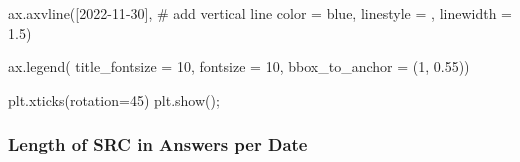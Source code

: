 \documentclass[
  letterpaper,
  DIV=11,
  numbers=noendperiod]{scrartcl}
\newenvironment{Shaded}{\begin{snugshade}}{\end{snugshade}}
\newcommand{\CommentTok}[1]{\textcolor[rgb]{0.37,0.37,0.37}{#1}}
\newcommand{\DecValTok}[1]{\textcolor[rgb]{0.68,0.00,0.00}{#1}}
\newcommand{\FloatTok}[1]{\textcolor[rgb]{0.68,0.00,0.00}{#1}}
\newcommand{\NormalTok}[1]{\textcolor[rgb]{0.00,0.23,0.31}{#1}}
\newcommand{\OperatorTok}[1]{\textcolor[rgb]{0.37,0.37,0.37}{#1}}
\newcommand{\StringTok}[1]{\textcolor[rgb]{0.13,0.47,0.30}{#1}}
\begin{document}
\begin{Shaded}
\begin{Highlighting}[]
\NormalTok{ax.axvline([}\StringTok{\textquotesingle{}2022{-}11{-}30\textquotesingle{}}\NormalTok{], }\CommentTok{\# add vertical line}
\NormalTok{           color }\OperatorTok{=} \StringTok{\textquotesingle{}blue\textquotesingle{}}\NormalTok{,}
\NormalTok{           linestyle }\OperatorTok{=} \StringTok{\textquotesingle{}{-}{-}\textquotesingle{}}\NormalTok{,}
\NormalTok{           linewidth }\OperatorTok{=} \FloatTok{1.5}\NormalTok{)}

\NormalTok{ax.legend( title\_fontsize }\OperatorTok{=} \DecValTok{10}\NormalTok{, fontsize }\OperatorTok{=} \DecValTok{10}\NormalTok{,}
\NormalTok{          bbox\_to\_anchor }\OperatorTok{=}\NormalTok{ (}\DecValTok{1}\NormalTok{, }\FloatTok{0.55}\NormalTok{))}


\NormalTok{plt.xticks(rotation}\OperatorTok{=}\DecValTok{45}\NormalTok{)}
\NormalTok{plt.show()}\OperatorTok{;}
\end{Highlighting}
\end{Shaded}

\subsubsection{Length of SRC in Answers per
Date}\label{length-of-src-in-answers-per-date}
\end{document}
